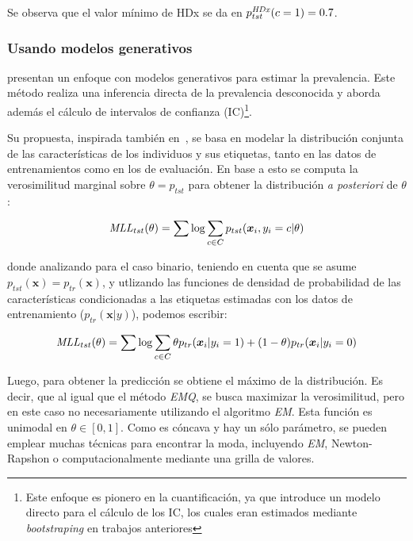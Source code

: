 Se observa que el valor mínimo de HDx se da en \(p^{\it HDx \/}_{tst}(c=1) =
0.7\).

\subsubsection{Usando modelos generativos}\label{estimacion:generativos}

\citet{keith2018uncertainty} presentan un enfoque con modelos generativos para
estimar la prevalencia. Este método realiza una inferencia directa de la
prevalencia desconocida y aborda además el cálculo de intervalos de confianza
(IC)\footnote{Este enfoque es pionero en la cuantificación, ya que introduce un
modelo directo para el cálculo de los IC, los cuales eran estimados mediante
{\it bootstraping\/} en trabajos anteriores}.

Su propuesta, inspirada también en~\citet{saerens2002adjusting}, se basa en
modelar la distribución conjunta de las características de los individuos y sus
etiquetas, tanto en las datos de entrenamientos como en los de evaluación. En
base a esto se computa la verosimilitud marginal sobre \(\theta=p_{tst}\) para
obtener la distribución {\it a posteriori\/} de \(\theta\):

\begin{equation}\label{ecuacion:mll}
    {\it MLL\/}_{tst}(\theta) = \sum {\log \sum_{c \in C}{p_{tst}(\boldsymbol{x}_i, y_i=c | \theta)}}
\end{equation}

donde analizando para el caso binario, teniendo en cuenta que se asume
\(p_{tst}(\boldsymbol{x})=p_{tr}(\boldsymbol{x})\), y utlizando las funciones de
densidad de probabilidad de las características condicionadas a las etiquetas
estimadas con los datos de entrenamiento (\(p_{tr}(\boldsymbol{x}|y)\)), podemos
escribir:

\begin{equation}\label{ecuacion:mll_bin}
    {\it MLL\/}_{tst}(\theta) = \sum {\log \sum_{c \in C}{\theta p_{tr}(\boldsymbol{x}_i | y_i=1) + (1- \theta) p_{tr}(\boldsymbol{x}_i | y_i=0)}}
\end{equation}

Luego, para obtener la predicción se obtiene el máximo de la distribución. Es
decir, que al igual que el método {\it EMQ}, se busca maximizar la
verosimilitud, pero en este caso no necesariamente utilizando el algoritmo {\it
EM}. Esta función es unimodal en \(\theta \in [0,1]\). Como es cóncava y hay un
sólo parámetro, se pueden emplear muchas técnicas para encontrar la moda,
incluyendo {\it EM}, Newton-Rapshon o computacionalmente mediante una grilla de
valores.

